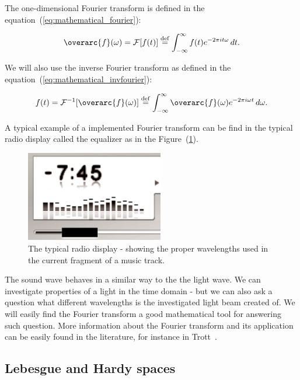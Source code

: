 \documentclass[12pt,twoside,a4paper]{article}
\numberwithin{equation}{subsection}
\numberwithin{figure}{subsection}
\begin{document}
The one-dimensional Fourier transform is defined in the equation~(\ref{eq:mathematical_fourier}):

\begin{equation} \label{eq:mathematical_fourier}
  \overarc{f}(\omega) = \mathcal{F}[f(t)] \stackrel{\mathrm{def}}{=} \int_{- \infty} ^ {\infty} f(t) e ^{-2 \pi i t \omega} \, dt .
\end{equation}

We will also use the inverse Fourier transform as defined in the equation~(\ref{eq:mathematical_invfourier}):

\begin{equation} \label{eq:mathematical_invfourier}
  f(t) = \mathcal{F}^{-1}[\overarc{f}(\omega)] \stackrel{\mathrm{def}}{=} \int_{- \infty} ^ {\infty} \overarc{f}(\omega) e ^{-2 \pi i
  \omega t} \, d\omega .
\end{equation}

A typical example of a implemented Fourier transform can be find in the typical radio display called the equalizer as in the Figure~(\ref{fig:mathematical_equalizer}).

\begin{figure} 
	\begin{center}
 		\includegraphics[width=60mm]{img/equalizer.png}
 		\caption{The typical radio display - showing the proper wavelengths used in the current fragment of a music track. \label{fig:mathematical_equalizer}}
	\end{center}
\end{figure} 

The sound wave behaves in a similar way to the the light wave. We can investigate properties of a light in the time domain - but we can also ask a question what different wavelengths is the investigated light beam created of. We will easily find the Fourier transform a good mathematical tool for answering such question. More information about the Fourier transform and its application can be easily found in the literature, for instance in Trott~\cite{trott_mathematica}.

\subsection{Lebesgue and Hardy spaces}
\end{document}
